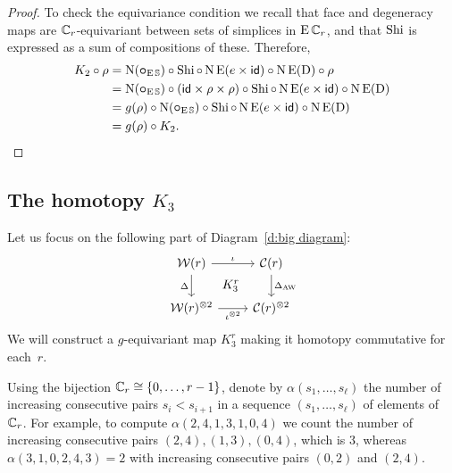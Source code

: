 \begin{proof}
	To check the equivariance condition we recall that face and degeneracy maps are $\mathbb{C}_r$-equivariant between sets of simplices in $\operatorname{E}\mathbb{C}_r$, and that $\operatorname{Shi}$ is expressed as a sum of compositions of these.
	Therefore,
	\begin{align*}
		K_2 \mathbin{\circ} \rho &=
		\operatorname{N}(\bm{\mathbin{\circ}}_{\operatorname{E}\mathbb{S}}) \mathbin{\circ} \operatorname{Shi} \mathbin{\circ} \operatorname{N}\operatorname{E}(e \times \mathsf{id}) \mathbin{\circ} \operatorname{N}\operatorname{E}(\mathrm{D}) \mathbin{\circ} \rho \\ &=
		\operatorname{N}(\bm{\mathbin{\circ}}_{\operatorname{E}\mathbb{S}}) \mathbin{\circ} (\mathsf{id} \times \rho \times \rho) \mathbin{\circ} \operatorname{Shi} \mathbin{\circ} \operatorname{N}\operatorname{E}(e \times \mathsf{id}) \mathbin{\circ} \operatorname{N}\operatorname{E}(\mathrm{D}) \\ &=
		g(\rho) \mathbin{\circ} \operatorname{N}(\bm{\mathbin{\circ}}_{\operatorname{E}\mathbb{S}}) \mathbin{\circ} \operatorname{Shi} \mathbin{\circ} \operatorname{N}\operatorname{E}(e \times \mathsf{id}) \mathbin{\circ} \operatorname{N}\operatorname{E}(\mathrm{D}) \\ &=
		g(\rho) \mathbin{\circ} K_2. \qedhere
	\end{align*}
\end{proof}

\subsection{The homotopy $K_3$}\label{ss:coproduct}

Let us focus on the following part of Diagram~\eqref{d:big diagram}:
\[
\begin{tikzcd}
	\cW(r)
	\arrow[r,"\iota"]
	\arrow[d,"\Delta"']
	\arrow[dr,phantom,"K_3^r"]
	& \cC(r)
	\arrow[d,"\Delta_{\AW}"] \\
	\cW(r)^{\ot 2}
	\arrow[r,"\iota^{\ot 2}"']
	& \cC(r)^{\ot 2}
\end{tikzcd}
\]
We will construct a $g$-equivariant map $K_3^r$ making it homotopy commutative for each~$r$.

Using the bijection $\mathbb{C}_r \cong \{0,\dots,r-1\}$, denote by $\alpha(s_1,\dots,s_\ell)$ the number of increasing consecutive pairs $s_i < s_{i+1}$ in a sequence $(s_1,\ldots,s_\ell)$ of elements of $\mathbb{C}_r$.
For example, to compute $\alpha(2,4,1,3,1,0,4)$ we count the number of increasing consecutive pairs $(2,4),(1,3),(0,4)$, which is $3$, whereas $\alpha(3,1,0,2,4,3) = 2$ with increasing consecutive pairs $(0,2)$ and $(2,4)$.

